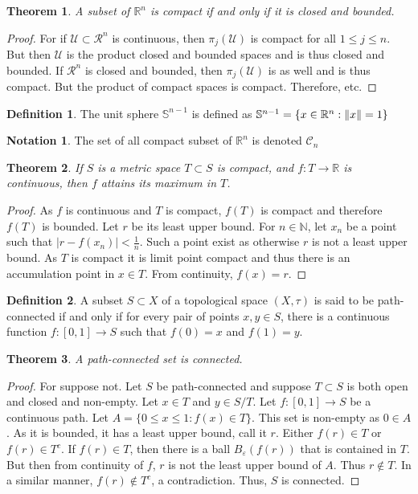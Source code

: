 \documentclass[oneside]{book}
\newtheorem{theorem}{Theorem}[section]
\theoremstyle{definition}
\newtheorem{definition}{Definition}[section]
\newtheorem{notation}{Notation}[section]
\begin{document}
\begin{theorem}
A subset of $\mathbb{R}^n$ is compact if and only if it is closed and bounded.
\end{theorem}
\begin{proof}
For if $\mathcal{U}\subset \mathcal{R}^n$ is continuous, then $\pi_{j}(\mathcal{U})$ is compact for all $1\leq j \leq n$. But then $\mathcal{U}$ is the product closed and bounded spaces and is thus closed and bounded. If $\mathcal{R}^n$ is closed and bounded, then $\pi_j(\mathcal{U})$ is as well and is thus compact. But the product of compact spaces is compact. Therefore, etc.
\end{proof}
\begin{definition}
The unit sphere $\mathbb{S}^{n-1}$ is defined as $\mathbb{S}^{n-1} = \{x\in \mathbb{R}^n: \norm{x}=1\}$
\end{definition}

\begin{notation}
The set of all compact subset of $\mathbb{R}^n$ is denoted $\mathscr{C}_n$
\end{notation}

\begin{theorem}
If $S$ is a metric space $T\subset S$ is compact, and $f:T\rightarrow \mathbb{R}$ is continuous, then $f$ attains its maximum in $T$.
\end{theorem}
\begin{proof}
As $f$ is continuous and $T$ is compact, $f(T)$ is compact and therefore $f(T)$ is bounded. Let $r$ be its least upper bound. For $n\in \mathbb{N}$, let $x_n$ be a point such that $|r-f(x_n)|< \frac{1}{n}$. Such a point exist as otherwise $r$ is not a least upper bound. As $T$ is compact it is limit point compact and thus there is an accumulation point in $x\in T$. From continuity, $f(x) = r$.
\end{proof}

\begin{definition}
A subset $S\subset X$ of a topological space $(X,\tau)$ is said to be path-connected if and only if for every pair of points $x,y\in S$, there is a continuous function $f:[0,1]\rightarrow S$ such that $f(0)=x$ and $f(1)=y$.
\end{definition}

\begin{theorem}
A path-connected set is connected.
\end{theorem}
\begin{proof}
For suppose not. Let $S$ be path-connected and suppose $T\subset S$ is both open and closed and non-empty. Let $x\in T$ and $y\in S/T$. Let $f:[0,1]\rightarrow S$ be a continuous path. Let $A =\{0\leq x \leq 1: f(x) \in T\}$. This set is non-empty as $0\in A$. As it is bounded, it has a least upper bound, call it $r$. Either $f(r)\in T$ or $f(r)\in T^c$. If $f(r)\in T$, then there is a ball $B_{\varepsilon}(f(r))$ that is contained in $T$. But then from continuity of $f$, $r$ is not the least upper bound of $A$. Thus $r\notin T$. In a similar manner, $f(r)\notin T^c$, a contradiction. Thus, $S$ is connected.
\end{proof}
\end{document}
